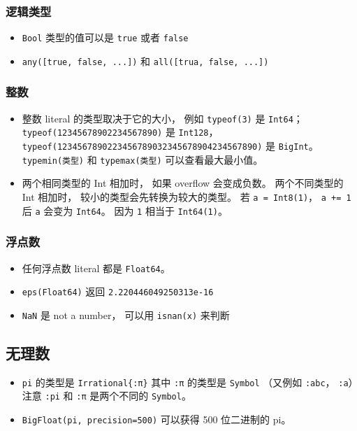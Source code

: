 \subsubsection{逻辑类型}
\begin{itemize}
\item \verb`Bool` 类型的值可以是 \verb`true` 或者 \verb`false`
\item \verb`any([true, false, ...])` 和 \verb`all([trua, false, ...])`
\end{itemize}

\subsubsection{整数}
\begin{itemize}
\item 整数 literal 的类型取决于它的大小， 例如 \verb`typeof(3)` 是 \verb`Int64`； \verb`typeof(12345678902234567890)` 是 \verb`Int128`， \verb`typeof(1234567890223456789032345678904234567890)` 是 \verb`BigInt`。 \verb`typemin(类型)` 和 \verb`typemax(类型)` 可以查看最大最小值。
\item 两个相同类型的 Int 相加时， 如果 overflow 会变成负数。 两个不同类型的 Int 相加时， 较小的类型会先转换为较大的类型。 若 \verb`a = Int8(1)`， \verb`a += 1` 后 \verb`a` 会变为 \verb`Int64`。 因为 \verb`1` 相当于 \verb`Int64(1)`。
\end{itemize}

\subsubsection{浮点数}
\begin{itemize}
\item 任何浮点数 literal 都是 \verb`Float64`。
\item \verb`eps(Float64)` 返回 \verb`2.220446049250313e-16`
\item \verb`NaN` 是 not a number， 可以用 \verb`isnan(x)` 来判断
\end{itemize}

\subsection{无理数}
\begin{itemize}
\item \verb`pi` 的类型是 \verb`Irrational{:π}` 其中 \verb`:π` 的类型是 \verb`Symbol` （又例如 \verb`:abc`， \verb`:a`）注意 \verb`:pi` 和 \verb`:π` 是两个不同的 \verb`Symbol`。
\item \verb`BigFloat(pi, precision=500)` 可以获得 500 位二进制的 pi。
\end{itemize}


